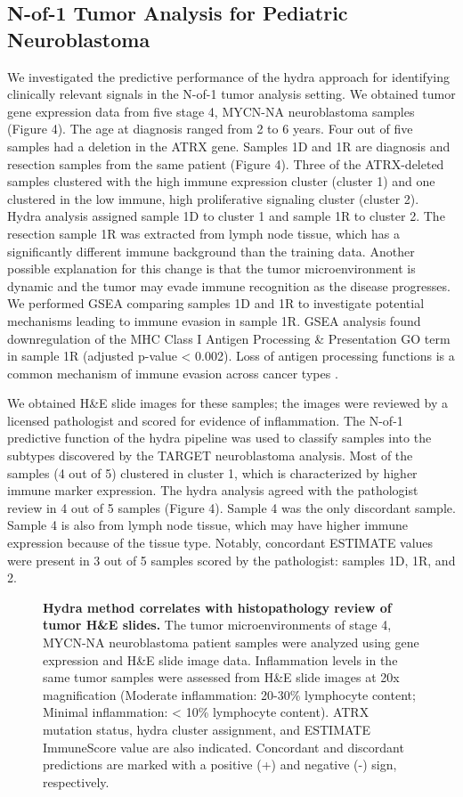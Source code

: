 \documentclass[10pt,letterpaper]{article}
\begin{document}
\subsection{N-of-1 Tumor Analysis for Pediatric Neuroblastoma}
We investigated the predictive performance of the hydra approach for identifying clinically relevant signals in the N-of-1 tumor analysis setting. We obtained tumor gene expression data from five stage 4, MYCN-NA neuroblastoma samples (Figure 4). The age at diagnosis ranged from 2 to 6 years. Four out of five samples had a deletion in the ATRX gene. Samples 1D and 1R are diagnosis and resection samples from the same patient (Figure 4). Three of the ATRX-deleted samples clustered with the high immune expression cluster (cluster 1) and one clustered in the low immune, high proliferative signaling cluster (cluster 2). Hydra analysis assigned sample 1D to cluster 1 and sample 1R to cluster 2. The resection sample 1R was extracted from lymph node tissue, which has a significantly different immune background than the training data. Another possible explanation for this change is that the tumor microenvironment is dynamic and the tumor may evade immune recognition as the disease progresses. We performed GSEA comparing samples 1D and 1R to investigate potential mechanisms leading to immune evasion in sample 1R. GSEA analysis found downregulation of the MHC Class I Antigen Processing \& Presentation GO term in sample 1R (adjusted p-value < 0.002). Loss of antigen processing functions is a common mechanism of immune evasion across cancer types \cite{reevesAntigenProcessingImmune2017}.

We obtained H\&E slide images for these samples; the images were reviewed by a licensed pathologist and scored for evidence of inflammation. The N-of-1 predictive function of the hydra pipeline was used to classify samples into the subtypes discovered by the TARGET neuroblastoma analysis. Most of the samples (4 out of 5) clustered in cluster 1, which is characterized by higher immune marker expression. The hydra analysis agreed with the pathologist review in 4 out of 5 samples (Figure 4). Sample 4 was the only discordant sample. Sample 4 is also from lymph node tissue, which may have higher immune expression because of the tissue type. Notably, concordant ESTIMATE values were present in 3 out of 5 samples scored by the pathologist: samples 1D, 1R, and 2.

\begin{figure}[!h]
\caption{{\bf Hydra method correlates with histopathology review of tumor H\&E slides.}
The tumor microenvironments of stage 4, MYCN-NA neuroblastoma patient samples were analyzed using gene expression and H\&E slide image data. Inflammation levels in the same tumor samples were assessed from H\&E slide images at 20x magnification (Moderate inflammation: 20-30\% lymphocyte content; Minimal inflammation: < 10\% lymphocyte content). ATRX mutation status, hydra cluster assignment, and ESTIMATE ImmuneScore value are also indicated. Concordant and discordant predictions are marked with a positive (+) and negative (-) sign, respectively.}
\label{hefig}
\end{figure}
\end{document}
